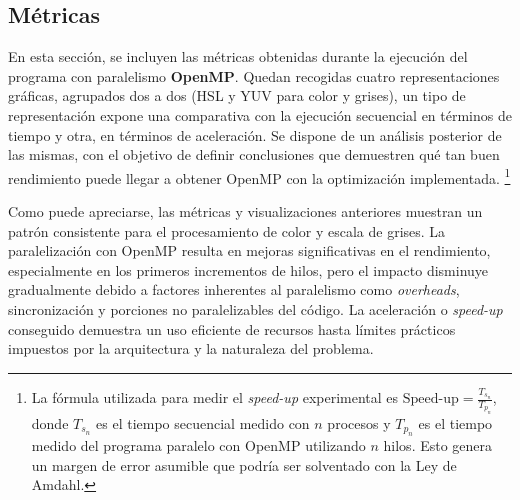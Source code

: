 \subsection{Métricas}
En esta sección, se incluyen las métricas obtenidas durante la ejecución del programa con paralelismo \textbf{OpenMP}. Quedan recogidas cuatro representaciones gráficas, agrupados dos a dos (HSL y YUV para color y grises), un tipo de representación expone una comparativa con la ejecución secuencial en términos de tiempo y otra, en términos de aceleración. Se dispone de un análisis posterior de las mismas, con el objetivo de definir conclusiones que demuestren qué tan buen rendimiento puede llegar a obtener OpenMP con la optimización implementada.
\footnote{\label{note:speedup}La fórmula utilizada para medir el \textit{speed-up} experimental es 
$\text{Speed-up} = \frac{T_{s_n}}{T_{p_n}}$, donde $T_{s_n}$ es el tiempo secuencial medido con $n$ procesos y $T_{p_n}$ es el tiempo medido del programa paralelo con OpenMP utilizando $n$ hilos. Esto genera un margen de error asumible que podría ser solventado con la Ley de Amdahl.}


\newpage
{}

Como puede apreciarse, las métricas y visualizaciones anteriores muestran un patrón consistente para el procesamiento de color y escala de grises. La paralelización con OpenMP resulta en mejoras significativas en el rendimiento, especialmente en los primeros incrementos de hilos, pero el impacto disminuye gradualmente debido a factores inherentes al paralelismo como \textit{overheads}, sincronización y porciones no paralelizables del código. La aceleración o \textit{speed-up} conseguido demuestra un uso eficiente de recursos hasta límites prácticos impuestos por la arquitectura y la naturaleza del problema.